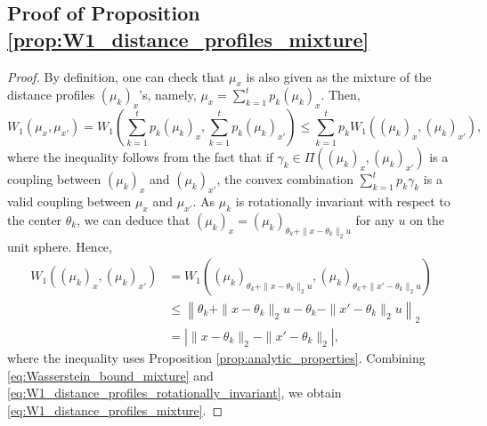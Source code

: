 \documentclass[11pt,letterpaper]{article}
\theoremstyle{definition}
\numberwithin{equation}{section}
\begin{document}
\subsection{Proof of Proposition \ref{prop:W1_distance_profiles_mixture}}
\begin{proof}
    By definition, one can check that $\mu_x$ is also given as the mixture of the distance profiles $(\mu_k)_x$'s, namely, $\mu_x = \sum_{k = 1}^{t} p_k (\mu_k)_x$. Then, 
    \begin{equation}
        \label{eq:Wasserstein_bound_mixture}
        W_1(\mu_x, \mu_{x'}) = W_1\left(\sum_{k = 1}^{t} p_k (\mu_k)_x, \sum_{k = 1}^{t} p_k (\mu_k)_{x'}\right) \le \sum_{k = 1}^{t} p_k W_1((\mu_k)_x, (\mu_k)_{x'}),
    \end{equation}
    where the inequality follows from the fact that if $\gamma_k \in \Pi((\mu_k)_x, (\mu_k)_{x'})$ is a coupling between $(\mu_k)_x$ and $(\mu_k)_{x'}$, the convex combination $\sum_{k = 1}^{t} p_k \gamma_k$ is a valid coupling between $\mu_x$ and $\mu_{x'}$. As $\mu_k$ is rotationally invariant with respect to the center $\theta_k$, we can deduce that $(\mu_k)_x = (\mu_k)_{\theta_k + \|x - \theta_k\|_2 u}$ for any $u$ on the unit sphere. Hence, 
    \begin{equation}
        \label{eq:W1_distance_profiles_rotationally_invariant}
        \begin{split}
            W_1((\mu_k)_x, (\mu_k)_{x'}) 
            & = W_1\left((\mu_k)_{\theta_k + \|x - \theta_k\|_2 u}, (\mu_k)_{\theta_k + \|x' - \theta_k\|_2 u}\right) \\
            & \le \left\|\theta_k + \|x - \theta_k\|_2 u - \theta_k - \|x' - \theta_k\|_2 u\right\|_2 \\
            & = \left|\|x - \theta_k\|_2 - \|x' - \theta_k\|_2\right|,            
        \end{split}
    \end{equation}
    where the inequality uses Proposition \ref{prop:analytic_properties}. Combining \eqref{eq:Wasserstein_bound_mixture} and \eqref{eq:W1_distance_profiles_rotationally_invariant}, we obtain \eqref{eq:W1_distance_profiles_mixture}.
\end{proof}
\end{document}
